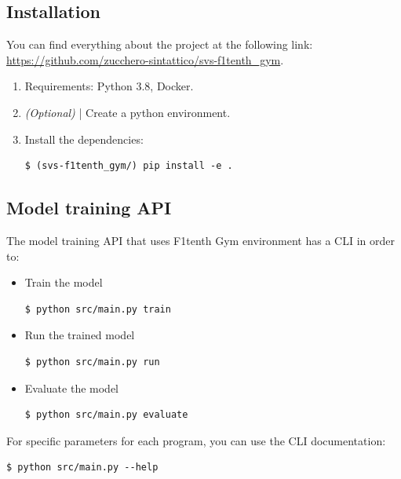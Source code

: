 \documentclass[conference]{IEEEtran}
\begin{document}


%
%
%
\subsection{Installation}

You can find everything about the project at the following link: \url{https://github.com/zucchero-sintattico/svs-f1tenth_gym}.

\begin{enumerate}
    \item Requirements: Python 3.8, Docker.

    \item \emph{(Optional)} | Create a python environment.

    \item Install the dependencies:
\begin{verbatim}
$ (svs-f1tenth_gym/) pip install -e .
\end{verbatim}
\end{enumerate}

%
%
%
\subsection{Model training API}

The model training API that uses F1tenth Gym environment has a CLI in order to:

\begin{itemize}
    \item Train the model
\begin{verbatim}
$ python src/main.py train
\end{verbatim}

    \item Run the trained model
\begin{verbatim}
$ python src/main.py run
\end{verbatim}

    \item Evaluate the model
\begin{verbatim}
$ python src/main.py evaluate
\end{verbatim}
\end{itemize}

For specific parameters for each program, you can use the CLI documentation:
\begin{verbatim}
$ python src/main.py --help
\end{verbatim}
\end{document}
